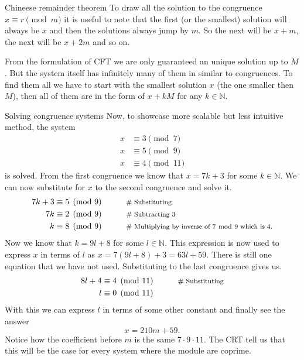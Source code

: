 \documentclass[final]{beamer}
\newlength{\colwidth}
\newcommand{\N}{\mathbb{N}}
\begin{document}
\begin{frame}[t]
\begin{columns}[t]
\begin{column}{\colwidth}
\begin{alertblock}{Chineese remainder theorem}
To draw all the solution to the congruence $x \equiv r \pmod{m}$ it is useful to
note that the first (or the smallest) solution will always be $x$ and then the
solutions always jump by $m$. So the next will be $x+m$, the next will be $x+2m$
and so on.

From the formulation of CFT we are only guaranteed an unique solution up to $M$.
But the system itself has infinitely many of them in similar to congruences. To
find them all we have to start with the smallest solution $x$ (the one smaller
then $M$), then all of them are in the form of $x + kM$ for any $k \in \N$.
 
 \end{alertblock}


 \begin{block}{Solving congruence systems}
  Now, to showcase more scalable but less intuitive method, the system
    \begin{equation*}
   \begin{split}
    x & \equiv 3 \pmod{7}\\
    x & \equiv 5 \pmod{9}\\
    x & \equiv 4 \pmod{11}
   \end{split}
  \end{equation*}
is solved. From the first congruence we know that $x= 7k +3$ for some $k \in
\N$. We can now substitute for $x$ to the second congruence and solve it.
\begin{equation*}
   \begin{aligned}
    7k +3 & \equiv 5 \pmod{9}  && \qquad    \text{\footnotesize{\# Substituting}} \\
    7k &\equiv 2 \pmod{9}&& \qquad \text{\footnotesize{\# Subtracting 3}}  \\
    k &\equiv 8 \pmod{9} &&\qquad \text{\footnotesize{\# Multiplying by inverse of 7 $\bmod~9$
    which is 4.}}
   \end{aligned}
  \end{equation*}
 Now we know that $k = 9l +8$ for some $l \in \N$. This expression is now used
 to express $x$ in terms of $l$ as $x=7(9l+8)+3 = 63l + 59$. There is
 still one equation that we have not used. Substituting to the last congruence
 gives us.
\begin{equation*}
   \begin{aligned}
    8l + 4 & \equiv 4 \pmod{11}  && \qquad    \text{\footnotesize{\# Substituting}} \\
    l &\equiv 0 \pmod{11}   
   \end{aligned}
  \end{equation*}
 With this we can express $l$ in terms of some other constant and finally see
 the answer
 \[
  x = 210m + 59 \text{.}
 \]
 Notice how the coefficient before $m$ is the same $7\cdot 9 \cdot 11$. The CRT
 tell us that this will be the case for every system where the module are
 coprime.



\end{block}
\end{column}
\end{columns}
\end{frame}
\end{document}
